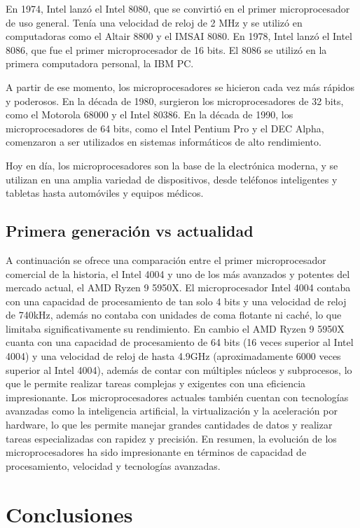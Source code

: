\documentclass{article}
\begin{document}
En 1974, Intel lanzó el Intel 8080, que se convirtió en el primer microprocesador de uso general. 
Tenía una velocidad de reloj de 2 MHz y se utilizó en computadoras como el Altair 8800 y el IMSAI 8080. 
En 1978, Intel lanzó el Intel 8086, que fue el primer microprocesador de 16 bits. El 8086 se utilizó en 
la primera computadora personal, la IBM PC.

A partir de ese momento, los microprocesadores se hicieron cada vez más rápidos y poderosos. En la década de 1980, 
surgieron los microprocesadores de 32 bits, como el Motorola 68000 y el Intel 80386. En la década de 1990, 
los microprocesadores de 64 bits, como el Intel Pentium Pro y el DEC Alpha, comenzaron a ser utilizados 
en sistemas informáticos de alto rendimiento.

Hoy en día, los microprocesadores son la base de la electrónica moderna, y se utilizan en una amplia 
variedad de dispositivos, desde teléfonos inteligentes y tabletas hasta automóviles y equipos médicos.

\subsection*{Primera generación vs actualidad}
A continuación se ofrece una comparación entre el primer microprocesador comercial de la historia, 
el Intel 4004 y uno de los más avanzados y potentes del mercado actual, el AMD Ryzen 9 5950X. 
El microprocesador Intel 4004 contaba con una capacidad de procesamiento de tan solo 4 bits y una 
velocidad de reloj de 740kHz, además no contaba con unidades de coma flotante ni caché, lo que limitaba 
significativamente su rendimiento. En cambio el AMD Ryzen 9 5950X cuanta con una capacidad de procesamiento
de 64 bits (16 veces superior al Intel 4004) y una velocidad de reloj de hasta 4.9GHz (aproximadamente 6000 veces superior 
al Intel 4004), además de contar con múltiples núcleos y subprocesos, lo que le permite realizar tareas complejas 
y exigentes con una eficiencia impresionante. Los microprocesadores actuales también cuentan con tecnologías avanzadas 
como la inteligencia artificial, la virtualización y la aceleración por hardware, lo que les permite manejar 
grandes cantidades de datos y realizar tareas especializadas con rapidez y precisión. En resumen, la evolución de 
los microprocesadores ha sido impresionante en términos de capacidad de procesamiento, velocidad y tecnologías avanzadas.


\newpage
\section*{Conclusiones}
\end{document}
